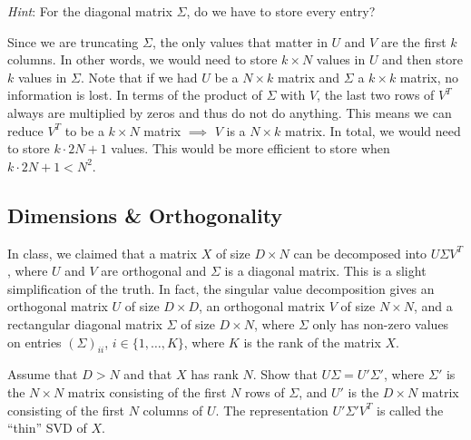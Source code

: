 \textit{Hint}: For the diagonal matrix $\Sigma$, do we have to store every entry?

\begin{solution}
	Since we are truncating $\Sigma$, the only values that matter in $U$ and $V$ are the first $k$ columns. In other words, we would need to store $k \times N$ values in $U$ and then store $k$ values in $\Sigma$. Note that if we had $U$ be a $N \times k$ matrix and $\Sigma$ a $k \times k$ matrix, no information is lost. In terms of the product of $\Sigma$ with $V$, the last two rows of $V^T$ always are multiplied by zeros and thus do not do anything. This means we can reduce $V^T$ to be a $k \times N$ matrix $\implies$ $V$ is a $N \times k$ matrix. In total, we would need to store $k\cdot{2N+1}$ values. This would be more efficient to store when $k\cdot{2N+1} < N^2$.
\end{solution}

\subsection{Dimensions \& Orthogonality} In class, we claimed that a matrix $X$ of size $D \times N$ can be decomposed into $U\Sigma V^T$, where $U$ and $V$ are orthogonal and $\Sigma$ is a diagonal matrix. This is a slight simplification of the truth. In fact, the singular value decomposition gives an orthogonal matrix $U$ of size $D \times D$, an orthogonal matrix $V$ of size $N \times N$, and a rectangular diagonal matrix $\Sigma$ of size $D \times N$, where $\Sigma$ only has non-zero values on entries $(\Sigma)_{ii}$, $i \in \{1, \ldots, K\}$, where $K$ is the rank of the matrix $X$. 

\problem[3]Assume that $D > N$ and that $X$ has rank $N$. Show that $U\Sigma = U'\Sigma'$, where $\Sigma'$ is the $N \times N$ matrix consisting of the first $N$ rows of $\Sigma$, and $U'$ is the $D \times N$ matrix consisting of the first $N$ columns of $U$. The representation $U'\Sigma' V^T$ is called the ``thin'' SVD of $X$.

